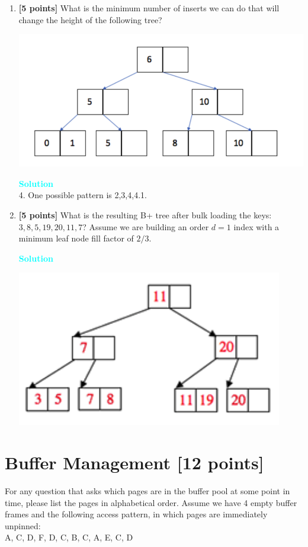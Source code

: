 \documentclass[10pt]{article}
\newenvironment{solution}
    { \begin{mdframed}[backgroundcolor=gray!10] \textcolor{cyan}{\textbf{Solution}} \\}
    {  \end{mdframed}}
\begin{document}
\begin{enumerate}
\item \textbf{[5 points]}
What is the minimum number of inserts we can do that will change the height of the following tree?
\begin{center}
\includegraphics[scale=0.3]{5.png}
\end{center}
\begin{solution}
4. One possible pattern is 2,3,4,4.1.
\end{solution}

\item \textbf{[5 points]}
What is the resulting B+ tree after bulk loading the keys: $3, 8, 5, 19, 20, 11, 7$? 
Assume we are building an order $d=1$ index with a minimum leaf node fill factor of $2/3$.
\begin{solution}
	\begin{center}
\includegraphics[scale=0.4]{6.png}
	\end{center}
\end{solution}

\end{enumerate}




\newpage
\section{Buffer Management \textbf{[12 points]}}
For any question that asks which pages are in the buffer pool at some point in time, please list the pages in alphabetical order.
Assume we have 4 empty buffer frames and the following access pattern, in which pages are immediately unpinned: \\
A, C, D, F, D, C, B, C, A, E, C, D \\
\end{document}
